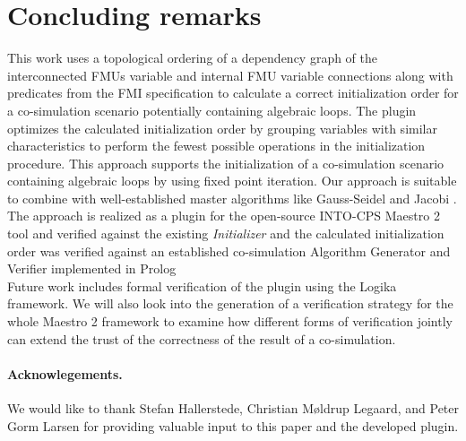 \section{Concluding remarks}\label{sc:summary}
This work uses a topological ordering of a dependency graph of the interconnected FMUs variable and internal FMU variable connections along with predicates from the FMI specification to calculate a correct initialization order for a co-simulation scenario potentially containing algebraic loops.
The plugin optimizes the calculated initialization order by grouping variables with similar characteristics to perform the fewest possible operations in the initialization procedure.
This approach supports the initialization of a co-simulation scenario containing algebraic loops by using fixed point iteration. 
Our approach is suitable to combine with well-established master algorithms like Gauss-Seidel and Jacobi \cite{Palensky2017}. 
The approach is realized as a plugin for the open-source INTO-CPS Maestro 2 tool and verified against the existing \textit{Initializer} and the calculated initialization order was verified against an established co-simulation Algorithm Generator and Verifier implemented in Prolog\cite{gomes_lucio_vangheluwe_2019}\\
Future work includes formal verification of the plugin using the Logika framework\cite{inbook}.
We will also look into the generation of a verification strategy for the whole Maestro 2 framework to examine how different forms of verification jointly can extend the trust of the correctness of the result of a co-simulation. 

\paragraph*{\textbf{Acknowlegements.}}We would like to thank Stefan Hallerstede, Christian Møldrup Legaard, and Peter Gorm Larsen for providing valuable input to this paper and the developed plugin.